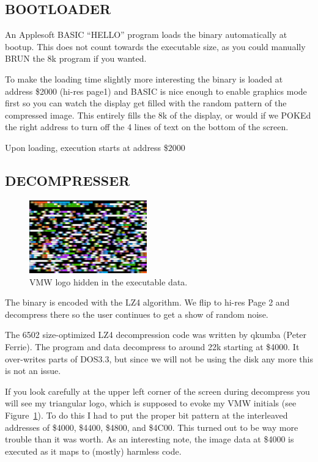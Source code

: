 \documentclass[twocolumn]{article}
\begin{document}
\subsection{BOOTLOADER}

An Applesoft BASIC ``HELLO'' program loads the binary automatically at bootup.
This does not count towards the executable size, as you could manually BRUN 
the 8k program if you wanted.

To make the loading time slightly more interesting the binary is loaded at
address \$2000 (hi-res page1) and BASIC is nice enough to enable
graphics mode first so you can watch the display get filled with the random
pattern of the compressed image.
This entirely fills the 8k of the display, or would
if we POKEd the right address to turn off
the 4 lines of text on the bottom of the screen.

Upon loading, execution starts at address \$2000

\subsection{DECOMPRESSER}

\begin{figure}[tb]
\begin{center}
\includegraphics[width=2in]{figures/hidden_vmw.png}
\end{center}
\caption{VMW logo hidden in the executable data.\label{fig:vmw}}
\end{figure}

The binary is encoded with the LZ4 algorithm.
We flip to hi-res Page 2 and decompress there so the user continues to get
a show of random noise.

The 6502 size-optimized LZ4 decompression code was written by qkumba
(Peter Ferrie).
The program and data decompress to around 22k starting at \$4000.
It over-writes parts of DOS3.3, but since we will not be using the disk 
any more this is not an issue.

If you look carefully at the upper left corner of the screen during
decompress you will see my triangular logo, which is supposed to evoke
my VMW initials (see Figure~\ref{fig:vmw}).
To do this I had to put the proper bit pattern at the interleaved
addresses of \$4000, \$4400, \$4800, and \$4C00.  
This turned out to be way more trouble than it was worth.
As an interesting note, the image data at \$4000 is executed as it maps
to (mostly) harmless code.
\end{document}
